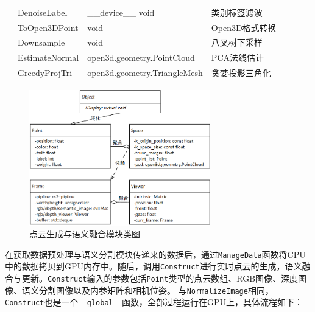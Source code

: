\begin{table}[htb]
\begin{tabular}{|l|m{2.8cm}|m{4.7cm}|m{4.5cm}|}
		                     & \centering\arraybackslash DenoiseLabel   & \centering\arraybackslash \_\_device\_\_ void          & \centering\arraybackslash 类别标签滤波                \\ \cline{2-4}
		                     & \centering\arraybackslash ToOpen3DPoint  & \centering\arraybackslash void                         & \centering\arraybackslash Open3D格式转换            \\ \cline{2-4}
		                     & \centering\arraybackslash Downsample     & \centering\arraybackslash void                         & \centering\arraybackslash 八叉树下采样                \\ \cline{2-4}
		                     & \centering\arraybackslash EstimateNormal & \centering\arraybackslash open3d.geometry.PointCloud   & \centering\arraybackslash PCA法线估计               \\ \cline{2-4}
		                     & \centering\arraybackslash GreedyProjTri  & \centering\arraybackslash open3d.geometry.TriangleMesh & \centering\arraybackslash 贪婪投影三角化               \\ \hline
	\end{tabular}
\end{table}

\begin{figure}[htb]
	\centering
	\includegraphics[width=0.7\textwidth]{figures/uml/class4.png}
	\caption{点云生成与语义融合模块类图}
	\label{fig:class4}
\end{figure}

\par 在获取数据预处理与语义分割模块传递来的数据后，通过\texttt{ManageData}函数将CPU中的数据拷贝到GPU内存中。随后，调用\texttt{Construct}进行实时点云的生成，语义融合与更新。\texttt{Construct}输入的参数包括\texttt{Point}类型的点云数组、RGB图像、深度图像、语义分割图像以及内参矩阵和相机位姿。
与\texttt{NormalizeImage}相同，\texttt{Construct}也是一个\texttt{\_\_global\_\_}函数，全部过程运行在GPU上，具体流程如下：

